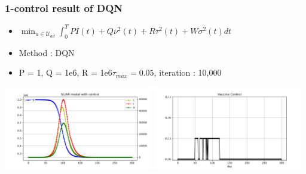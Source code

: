 \documentclass[usenames,dvipsnames, aspectratio=169, 9pt]{beamer}
\begin{document}
\begin{frame}\frametitle{1-control result of DQN}
\begin{itemize}
\item $ \min_{u\in\mathcal{U}_{ad}} \int_0^T PI(t) + Q\nu^2(t) + R\tau^2(t) + W\sigma^2(t) dt$
\item Method : DQN
\item P = 1, Q = 1e6, R = 1e6$\tau_{max} = 0.05$, iteration : 10,000
\end{itemize}
    \centering
    \includegraphics[width=6.5cm]{figure/sliar_dqn_tau.png}
    \includegraphics[width=6.5cm]{figure/sliar_dqn_tau_control.png}
\end{frame}
\end{document}
